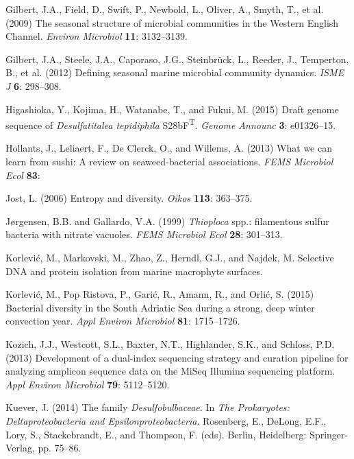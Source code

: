 \documentclass[12pt,]{article}
\begin{document}
\leavevmode\hypertarget{ref-Gilbert2009}{}%
Gilbert, J.A., Field, D., Swift, P., Newbold, L., Oliver, A., Smyth, T.,
et al. (2009) The seasonal structure of microbial communities in the
Western English Channel. \emph{Environ Microbiol} \textbf{11}:
3132--3139.

\leavevmode\hypertarget{ref-Gilbert2012}{}%
Gilbert, J.A., Steele, J.A., Caporaso, J.G., Steinbrück, L., Reeder, J.,
Temperton, B., et al. (2012) Defining seasonal marine microbial
community dynamics. \emph{ISME J} \textbf{6}: 298--308.

\leavevmode\hypertarget{ref-Higashioka2015}{}%
Higashioka, Y., Kojima, H., Watanabe, T., and Fukui, M. (2015) Draft
genome sequence of \emph{Desulfatitalea tepidiphila}
S28bF\textsuperscript{T}. \emph{Genome Announc} \textbf{3}: e01326--15.

\leavevmode\hypertarget{ref-Hollants2013}{}%
Hollants, J., Leliaert, F., De Clerck, O., and Willems, A. (2013) What
we can learn from sushi: A review on seaweed-bacterial associations.
\emph{FEMS Microbiol Ecol} \textbf{83}:

\leavevmode\hypertarget{ref-Jost2006}{}%
Jost, L. (2006) Entropy and diversity. \emph{Oikos} \textbf{113}:
363--375.

\leavevmode\hypertarget{ref-Jorgensen1999}{}%
Jørgensen, B.B. and Gallardo, V.A. (1999) \emph{Thioploca} spp.:
filamentous sulfur bacteria with nitrate vacuoles. \emph{FEMS Microbiol
Ecol} \textbf{28}: 301--313.

\leavevmode\hypertarget{ref-Korlevica}{}%
Korlević, M., Markovski, M., Zhao, Z., Herndl, G.J., and Najdek, M.
Selective DNA and protein isolation from marine macrophyte surfaces.

\leavevmode\hypertarget{ref-Korlevic2015}{}%
Korlević, M., Pop Ristova, P., Garić, R., Amann, R., and Orlić, S.
(2015) Bacterial diversity in the South Adriatic Sea during a strong,
deep winter convection year. \emph{Appl Environ Microbiol} \textbf{81}:
1715--1726.

\leavevmode\hypertarget{ref-Kozich2013}{}%
Kozich, J.J., Westcott, S.L., Baxter, N.T., Highlander, S.K., and
Schloss, P.D. (2013) Development of a dual-index sequencing strategy and
curation pipeline for analyzing amplicon sequence data on the MiSeq
Illumina sequencing platform. \emph{Appl Environ Microbiol} \textbf{79}:
5112--5120.

\leavevmode\hypertarget{ref-Kuever2014}{}%
Kuever, J. (2014) The family \emph{Desulfobulbaceae}. In \emph{The
Prokaryotes: Deltaproteobacteria and Epsilonproteobacteria}. Rosenberg,
E., DeLong, E.F., Lory, S., Stackebrandt, E., and Thompson, F. (eds).
Berlin, Heidelberg: Springer-Verlag, pp. 75--86.
\end{document}

